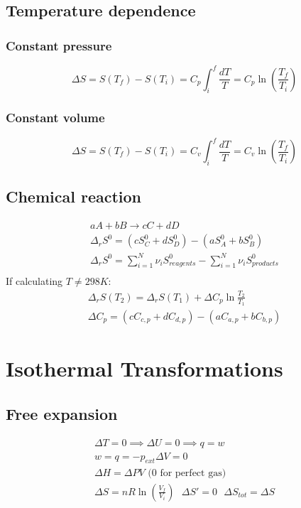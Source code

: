 \documentclass[Master.tex]{subfiles}
\begin{document}
\begin{multicols}{2}
		  \subsection{Temperature dependence}
				   \subsubsection{Constant pressure}
						    \[
								     \Delta S = S(T_{f}) - S(T_{i}) = C_{p}\int_{i}^{f} \frac{dT}{T} = C_{p}\ln \left( \frac{T_{f}}{T_{i} }  \right)
						    \]
				   \subsubsection{Constant volume}
						    \[
								     \Delta S = S(T_{f}) - S(T_{i}) = C_{v}\int_{i}^{f} \frac{dT}{T} = C_{v}\ln \left( \frac{T_{f}}{T_{i} }  \right)
						    \]
		  \subsection{Chemical reaction}
				   \begin{gather*}
						    aA + bB \to cC + dD\\
						    \Delta _{r}S^{0}  = (cS^{0} _{C} + dS^{0} _{D}) - (aS^{0} _{A} + bS^{0} _{B}  )\\
						    \Delta _{r}  S^{0} = \sum_{i=1}^{N} \nu_{i}  S^{0} _{reagents} - \sum_{i=1}^{N} \nu_{i}  S^{0} _{products} \\
				   \end{gather*}
				   If calculating \( T \neq 298 K\):
				   \begin{gather*}
						    \Delta _{r}S (T_2) = \Delta _{r}S (T_1) + \Delta C_{p}\ln \frac{T_2}{T_1}\\
						    \Delta C_{p} = (cC_{c,p} + dC_{d,p}) - (aC_{a,p} + bC_{b,p})
				   \end{gather*}
		 \section{Isothermal Transformations}
		  \subsection{Free expansion}
				   \begin{gather*}
						    \Delta T = 0 \implies \Delta U = 0 \implies q = w\\
						    w = q = - p_{ext} \Delta V = 0\\
						    \Delta H = \Delta PV \text{ (0 for perfect gas)}\\
						    \Delta S = nR\ln (\frac{V_f}{V_i}) ~ ~ ~\Delta S' = 0 ~ ~ ~ \Delta S_{tot} = \Delta S
				   \end{gather*}


\end{multicols}
\end{document}
